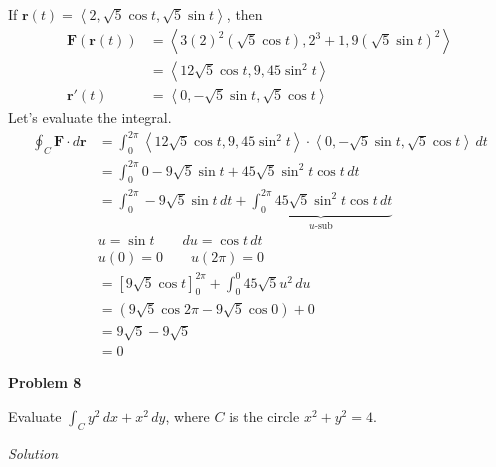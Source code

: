 \documentclass{article}
\newcommand{\lrp}[1]{\left( #1 \right)}
\newcommand{\lra}[1]{\left\langle #1 \right\rangle}
\newcommand{\lrb}[1]{\left[ #1 \right]}
\renewcommand{\r}[0]{\mathbf{r}}
\newcommand{\F}[0]{\mathbf{F}}
\newcommand{\Solution}{\textit{Solution}}
\begin{document}
If $\r(t)=\lra{2, \sqrt{5}\cos t,\sqrt{5}\sin t}$, then
\begin{align*}
    \F\lrp{\r(t)}&=\lra{3(2)^2\lrp{\sqrt{5}\cos t}, 2^3+1, 9\lrp{\sqrt{5}\sin t}^2}\\
    &=\lra{12\sqrt{5}\cos t, 9, 45\sin^2 t}\\
    \r'(t)&=\lra{0, -\sqrt{5}\sin t, \sqrt{5}\cos t}
\end{align*}
Let's evaluate the integral.
\begin{align*}
    \oint_C \F\cdot d\r &=\int_0^{2\pi}\lra{12\sqrt{5}\cos t, 9, 45\sin^2 t}\cdot \lra{0, -\sqrt{5}\sin t, \sqrt{5}\cos t}\,dt\\
    &=\int_0^{2\pi} 0 -9\sqrt{5}\sin t+ 45\sqrt{5}\sin^2 t\cos t\,dt\\
    &=\int_0^{2\pi} -9\sqrt{5}\sin t\,dt + \underbrace{\int_0^{2\pi} 45\sqrt{5}\sin^2 t\cos t\,dt}_{u\text{-sub}}\\
    &u=\sin t\hspace{2em}du=\cos t\,dt\\
    &u(0)=0\hspace{2em}u(2\pi)=0\\
    &=\lrb{9\sqrt{5}\cos t}_0^{2\pi}+\int_0^0 45\sqrt{5}u^2\,du\\
    &=\lrp{9\sqrt{5}\cos 2\pi-9\sqrt{5}\cos 0}+0\\
    &=9\sqrt{5}-9\sqrt{5}\\
    &=\boxed{0}
\end{align*}

{}\textbf{Problem 8}

Evaluate $\displaystyle \int_C y^2\,dx+x^2\,dy$, where $C$ is the circle $x^2+y^2=4$.

\Solution
\end{document}

